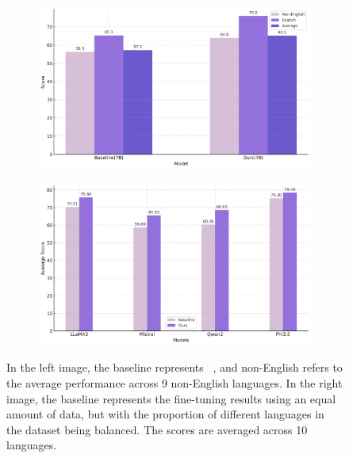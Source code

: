 \documentclass[11pt]{article}
\begin{document}
\begin{figure}[h]
    \centering
    \begin{subfigure}{0.45\textwidth}
        \centering
        \includegraphics[width=\textwidth]{picture/figure7_msvamp_llama2.png} 
        \label{fig:subfig1}
    \end{subfigure}
    \hfill
    \begin{subfigure}{0.45\textwidth}
        \centering
        \includegraphics[width=\textwidth]{picture/figure7_MSVAMP.png} 
        \label{fig:subfig2}
    \end{subfigure}
    \caption{In the left image, the baseline represents ~\citep{zhu2024power}, and non-English refers to the average performance across 9 non-English languages. In the right image, the baseline represents the fine-tuning results using an equal amount of data, but with the proportion of different languages in the dataset being balanced. The scores are averaged across 10 languages.}
    \label{fig:overall}
\end{figure}
\end{document}
